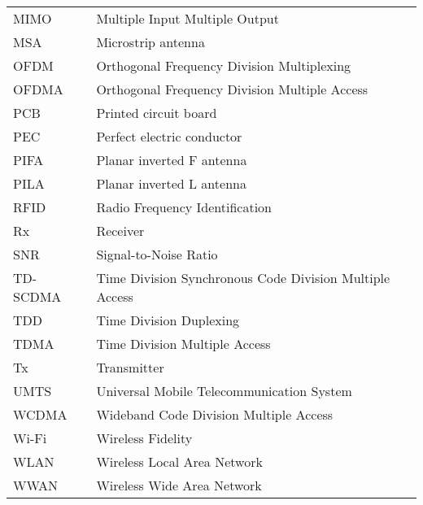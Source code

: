 \begin{tabular}{ll}
MIMO        & Multiple Input Multiple Output \\
MSA         & Microstrip antenna\\
OFDM        & Orthogonal Frequency Division Multiplexing \\
OFDMA       & Orthogonal Frequency Division Multiple Access\\
PCB         & Printed circuit board\\
PEC         & Perfect electric conductor\\
PIFA        & Planar inverted F antenna\\
PILA        & Planar inverted L antenna\\
RFID        & Radio Frequency Identification \\
Rx          & Receiver \\
SNR         & Signal-to-Noise Ratio \\
TD-SCDMA    & Time Division Synchronous Code Division Multiple Access \\
TDD         & Time Division Duplexing \\
TDMA        & Time Division Multiple Access \\
Tx          & Transmitter \\
UMTS        & Universal Mobile Telecommunication System \\
WCDMA       & Wideband Code Division Multiple Access \\
Wi-Fi       & Wireless Fidelity \\
WLAN        & Wireless Local Area Network \\
WWAN        & Wireless Wide Area Network\\
\end{tabular}
